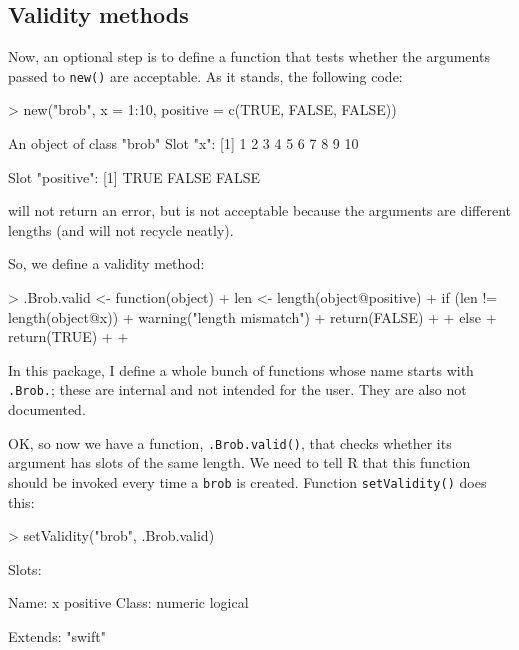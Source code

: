 \documentclass[a4paper]{article}
\begin{document}
\subsection{Validity methods}

Now, an optional step is to define a function that tests whether the
arguments passed to {\tt new()} are acceptable.  As it stands, the
following code:
\begin{Schunk}
\begin{Sinput}
> new("brob", x = 1:10, positive = c(TRUE, FALSE, FALSE))
\end{Sinput}
\begin{Soutput}
An object of class "brob"
Slot "x":
 [1]  1  2  3  4  5  6  7  8  9 10

Slot "positive":
[1]  TRUE FALSE FALSE
\end{Soutput}
\end{Schunk}

will not return an error, but is not acceptable because the arguments
are different lengths (and will not recycle neatly).


So, we define a validity method:

\begin{Schunk}
\begin{Sinput}
> .Brob.valid <- function(object) {
+     len <- length(object@positive)
+     if (len != length(object@x)) {
+         warning("length mismatch")
+         return(FALSE)
+     }
+     else {
+         return(TRUE)
+     }
+ }
\end{Sinput}
\end{Schunk}

In this package, I define a whole bunch of functions whose name starts
with {\tt .Brob.}; these are internal and not intended for the user.
They are also not documented.

OK, so now we have a function, {\tt .Brob.valid()}, that checks
whether its argument has slots of the same length.  We need to tell R
that this function should be invoked every time a {\tt brob} is
created.  Function {\tt setValidity()} does this:

\begin{Schunk}
\begin{Sinput}
> setValidity("brob", .Brob.valid)
\end{Sinput}
\begin{Soutput}
Slots:
                        
Name:         x positive
Class:  numeric  logical

Extends: "swift"
\end{Soutput}
\end{Schunk}
\end{document}
